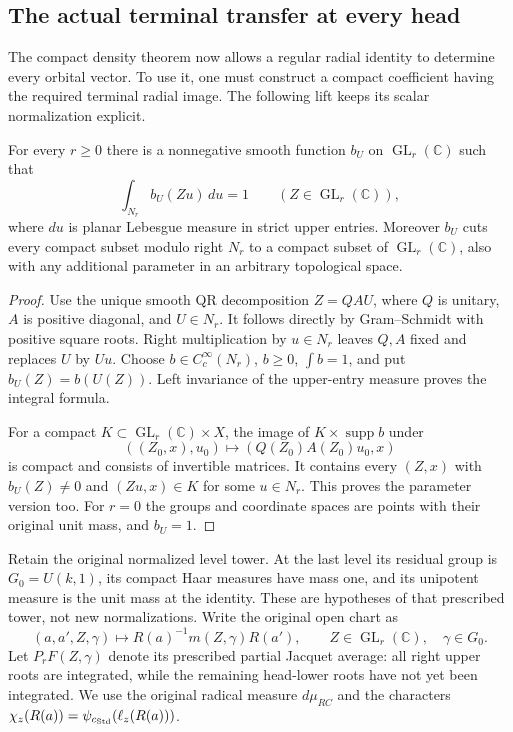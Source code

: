 \subsection{The actual terminal transfer at every head}
\label{actual-terminal-transfer}

The compact density theorem now allows a regular radial identity to
determine every orbital vector.  To use it, one must construct a compact
coefficient having the required terminal radial image.  The following
lift keeps its scalar normalization explicit.

\begin{lemma}\label{terminal-transfer-upper-cut}
For every $r\ge0$ there is a nonnegative smooth function $b_U$ on
$\operatorname{GL}_r(\mathbb C)$ such that
\[
       \int_{N_r}b_U(Zu)\,du=1\qquad(Z\in\operatorname{GL}_r(\mathbb C)),
\]
where $du$ is planar Lebesgue measure in strict upper entries.
Moreover $b_U$ cuts every compact subset modulo right $N_r$ to a
compact subset of $\operatorname{GL}_r(\mathbb C)$, also with any
additional parameter in an arbitrary topological space.
\end{lemma}

\begin{proof}
Use the unique smooth QR decomposition $Z=QAU$, where $Q$ is
unitary, $A$ is positive diagonal, and $U\in N_r$.  It follows
directly by Gram--Schmidt with positive square roots.  Right
multiplication by $u\in N_r$ leaves $Q,A$ fixed and replaces
$U$ by $Uu$.  Choose $b\in C_c^\infty(N_r)$, $b\ge0$,
$\int b=1$, and put $b_U(Z)=b(U(Z))$.  Left invariance of the
upper-entry measure proves the integral formula.

For a compact $K\subset\operatorname{GL}_r(\mathbb C)\times X$,
the image of $K\times\operatorname{supp}b$ under
\[
       ((Z_0,x),u_0)\longmapsto(Q(Z_0)A(Z_0)u_0,x)
\]
is compact and consists of invertible matrices.  It contains
every $(Z,x)$ with $b_U(Z)\ne0$ and $(Zu,x)\in K$ for some
$u\in N_r$.  This proves the parameter version too.  For
$r=0$ the groups and coordinate spaces are points with their
original unit mass, and $b_U=1$.
\end{proof}

Retain the original normalized level tower.  At the last level
its residual group is $G_0=U(k,1)$, its compact Haar measures
have mass one, and its unipotent measure is the unit mass at
the identity.  These are hypotheses of that prescribed tower,
not new normalizations.  Write the original open chart as
\[
       (a,a',Z,\gamma)\longmapsto
          R(a)^{-1}m(Z,\gamma)R(a'),
       \qquad Z\in\operatorname{GL}_r(\mathbb C),\quad\gamma\in G_0.
\]
Let $P_rF(Z,\gamma)$ denote its prescribed partial Jacquet
average: all right upper roots are integrated, while the
remaining head-lower roots have not yet been integrated.
We use the original radical measure $d\mu_{RC}$ and the
characters $\chi_z(R(a))=\psi_{c_{\rm Std}}(\ell_z(R(a)))$.

